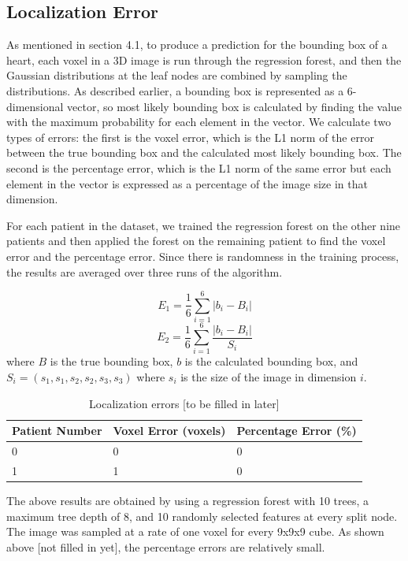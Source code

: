 \subsection{Localization Error}
As mentioned in section 4.1, to produce a prediction for the bounding box of a heart, each voxel in a 3D image is run through the regression forest, and then the Gaussian distributions at the leaf nodes are combined by sampling the distributions. As described earlier, a bounding box is represented as a 6-dimensional vector, so most likely bounding box is calculated by finding the value with the maximum probability for each element in the vector. We calculate two types of errors: the first is the voxel error, which is the L1 norm of the error between the true bounding box and the calculated most likely bounding box. The second is the percentage error, which is the L1 norm of the same error but each element in the vector is expressed as a percentage of the image size in that dimension.

For each patient in the dataset, we trained the regression forest on the other nine patients and then applied the forest on the remaining patient to find the voxel error and the percentage error. Since there is randomness in the training process, the results are averaged over three runs of the algorithm.

\begin{equation}
  E_1 = \frac{1}{6} \sum_{i=1} ^ {6} |b_i - B_i|
\end{equation}
\begin{equation}
  E_2 = \frac{1}{6} \sum_{i=1} ^ {6} \frac{|b_i - B_i|}{S_{i}}
\end{equation}
where $B$ is the true bounding box, $b$ is the calculated bounding box, and $S_i = (s_1, s_1, s_2, s_2, s_3, s_3)$ where $s_i$ is the size of the image in dimension $i$.

\begin{table}
  \caption{Localization errors [to be filled in later]}
  \label{tab:err}
  \begin{tabular}{p{2cm}p{2cm}p{2cm}}
    \toprule
    Patient Number & Voxel Error (voxels) & Percentage Error (\%) \\
    \midrule
    0 & 0 & 0\\
    1 & 1 & 0\\
    \bottomrule
  \end{tabular}
\end{table}

The above results are obtained by using a regression forest with 10 trees, a maximum tree depth of 8, and 10 randomly selected features at every split node. The image was sampled at a rate of one voxel for every 9x9x9 cube. As shown above [not filled in yet], the percentage errors are relatively small.


